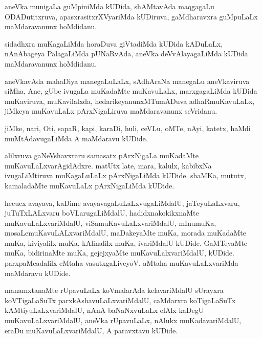 \documentclass{article}
\begin{document}
\begin{mn}
aneVka  munigaLa  guMpiniMda  kUDida,  shAMtavAda  maqgagaLu  ODADutitxruva,  apasxrasitxrXVyariMda  
kUDiruva,  gaMdharavxra  guMpuLaLx  maMdaravanunx  hoMdidanu.
\end{mn}

\begin{mn}
sidadhxra  muKagaLiMda  horaDuva  giVtadiMda  kUDida  kADuLaLx,  nAnAbageya  PalagaLiMda  pUNaRvAda,  
aneVka  deVvAlayagaLiMda  kUDida  maMdaravanunx  hoMdidanu.
\end{mn}

\begin{mn}
aneVkavAda  mahaDiya  manegaLuLaLx,  sAdhAraNa  manegaLu  aneVkaviruva  siMha,  Ane,  gUbe  ivugaLa  
muKadaMte  muKavuLaLx,  marxgagaLiMda  kUDida  muKaviruva,  muKavilalxda,  hedarikeyanunxMTumADuva  
adhaRmuKavuLaLx,  jiMkeya  muKavuLaLx  pArxNigaLiruva  maMdaravanunx  seVridanu.
\end{mn}

\begin{mn}
jiMke,  nari,  Oti,  sapaR,  kapi,  karaDi,  huli,  ceVLu,  oMTe,  nAyi,  katetx,  haMdi  muMtAdavugaLiMda  
A  maMdaravu  kUDide.
\end{mn}

\begin{mn}
alilxruva  gaNeVshavxraru  samasatx  pArxNigaLa  muKadaMte  muKavuLaLxvarAgidAdxre.  matUtx  late,  
mara,  kalulx,  kabibxNa  ivugaLiMtiruva  muKagaLuLaLx  pArxNigaLiMda  kUDide.  shaMKa,  mututx,  
kamaladaMte  muKavuLaLx  pArxNigaLiMda  kUDide.
\end{mn}

\begin{mn}
hecucx  avayava,  kaDime  avayavagaLuLaLxvugaLiMdalU,  jaTeyuLaLxvaru,  juTuTxLALxvaru  boVLarugaLiMdalU,  
hadidxnakokikxnaMte  muKavuLaLxvariMdalU,  viSamuKavuLaLxvariMdalU,  mInumuKa,  mosaLemuKavuLALxvariMdalU,  
maDakeyaMte  muKa,  morada  muKadaMte  muKa,  kiviyalilx muKa,  kAlinalilx  muKa,  ivariMdalU  kUDide.  
GaMTeyaMte  muKa,  bidirinaMte  muKa,  gejejxyaMte  muKavuLalxvariMdalU,  kUDide.  parxpaMcadalilx  eMtaha  
vasutxgaLiveyoV,  aMtaha  muKavuLaLxvariMda  maMdaravu  kUDide.
\end{mn}

\begin{mn}
manamxtanaMte  rUpavuLaLx  koVmalarAda  kelavariMdalU  sUrayxra  koVTigaLaSuTx  parxkAshavuLaLxvariMdalU,  
caMdarxra  koTigaLaSuTx  kAMtiyuLaLxvariMdalU,  nAnA  baNaNxvuLaLx  elAlx  kaDegU  muKavuLaLxvariMdalU,  
aneVka  rUpavuLaLx,  nAlukx  muKadavariMdalU,  eraDu  muKavuLaLxvariMdalU,  A  paravxtavu  kUDide.
\end{mn}
\end{document}
